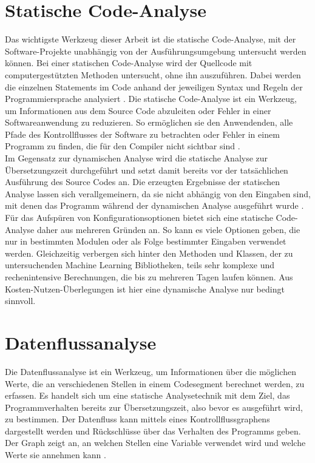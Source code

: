\documentclass[german,bachelor]{swsLeipzig}
\begin{document}
\section{Statische Code-Analyse}
Das wichtigste Werkzeug dieser Arbeit ist die statische Code-Analyse,
mit der Software-Projekte unabhängig von der Ausführungsumgebung untersucht werden können.
Bei einer statischen Code-Analyse wird der Quellcode mit computergestützten Methoden untersucht, ohne ihn auszuführen.
Dabei werden die einzelnen Statements im Code anhand der jeweiligen Syntax und Regeln der Programmiersprache analysiert \cite[]{gomes2009overview}.
Die statische Code-Analyse ist ein Werkzeug, um Informationen aus dem Source Code abzuleiten oder
Fehler in einer Softwareanwendung zu reduzieren.
So ermöglichen sie den Anwendenden, alle Pfade des Kontrollflusses der Software zu betrachten oder
Fehler in einem Programm zu finden, die für den Compiler nicht sichtbar sind \cite[]{bardas2010static}.\\
\indent Im Gegensatz zur dynamischen Analyse wird die statische Analyse zur Übersetzungszeit durchgeführt
und setzt damit bereits vor der tatsächlichen Ausführung des Source Codes an.
Die erzeugten Ergebnisse der statischen Analyse lassen sich verallgemeinern, da sie nicht abhängig von den Eingaben sind,
mit denen das Programm während der dynamischen Analyse ausgeführt wurde \cite[]{gomes2009overview}.\\
\indent Für das Aufspüren von Konfigurationsoptionen bietet sich eine statische Code-Analyse daher aus mehreren Gründen an.
So kann es viele Optionen geben, die nur in bestimmten Modulen oder als Folge bestimmter Eingaben verwendet werden.
Gleichzeitig verbergen sich hinter den Methoden und Klassen, der zu untersuchenden Machine Learning Bibliotheken,
teils sehr komplexe und rechenintensive Berechnungen, die bis zu mehreren Tagen laufen können.
Aus Kosten-Nutzen-Überlegungen ist hier eine dynamische Analyse nur bedingt sinnvoll.\\

\section{Datenflussanalyse}
Die Datenflussanalyse ist ein Werkzeug, um Informationen über die möglichen Werte, die an verschiedenen
Stellen in einem Codesegment berechnet werden, zu erfassen.
Es handelt sich um eine statische Analysetechnik mit dem Ziel, das Programmverhalten bereits zur Übersetzungszeit,
also bevor es ausgeführt wird, zu bestimmen.
Der Datenfluss kann mittels eines Kontrollflussgraphens dargestellt werden und Rückschlüsse über das Verhalten des Programms geben.
Der Graph zeigt an, an welchen Stellen eine Variable verwendet wird und welche Werte sie annehmen kann \cite[]{58766}.\\
\end{document}
